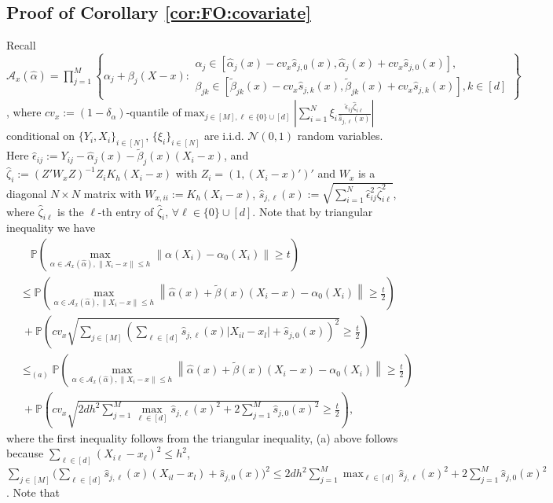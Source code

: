 \documentclass[11pt]{article}
\newcommand{\norm}[1]{\left\lVert #1 \right\rVert}
\begin{document}
\subsection{Proof of Corollary \ref{cor:FO:covariate}}
Recall  $\displaystyle\mathcal{A}_x(\hat\alpha) =\prod_{j=1}^M \left\{ \alpha_j+\beta_j(X-x) : \begin{array}{l}\alpha_j \in [\hat \alpha_j(x) - cv_x \hat s_{j,0}(x), \hat\alpha_j(x) + cv_x \hat s_{j,0}(x)], \\ 
\beta_{jk} \in [\tilde \beta_{jk}(x) - cv_x \hat s_{j,k}(x), \tilde \beta_{jk}(x) + cv_x \hat s_{j,k}(x)], k \in [d] 
\end{array}\right\}$,
where $cv_x := (1-\delta_\alpha)\mbox{-quantile of} \max_{ j \in  [M], \ell \in\{0\}\cup[d]}\left|\sum_{i=1}^N \xi_i \frac{\hat \epsilon_{ij} \hat{\zeta}_{i\ell}}{\hat s_{j,\ell}(x)}\right|$
$\mbox{conditional on }\{Y_i,X_i\}_{i\in[N]}$, $\{\xi_i\}_{i\in[N]}$ are i.i.d. $\mathcal{N}(0,1)$ random variables. Here $\hat\epsilon_{ij}:=Y_{ij} - \hat{\alpha}_j(x)-\tilde\beta_j(x)(X_i-x)$, and $\hat{\zeta}_{i} := (Z'W_xZ)^{-1}Z_i K_h(X_i-x)$  with $Z_i=(1, (X_i-x)')'$ and $W_{x}$ is a diagonal $N\times N$ matrix with $W_{x,ii}:=K_h(X_i-x)$, $\hat s_{j,\ell}(x) := \sqrt{\sum_{i=1}^N \hat \epsilon_{ij}^2 \hat{\zeta}_{i\ell}^2}$, where $\hat{\zeta}_{i\ell}$ is the $\ell$-th entry of $\hat{\zeta}_i$, $\forall \ell\in\{0\}\cup[d]$.  Note that by triangular inequality we have 
$$\begin{array}{rl}
&\quad\displaystyle\mathbb{P}\left(\max_{\alpha \in \mathcal{A}_x(\hat\alpha), \|X_i-x\|\leq h}\norm{\alpha(X_i)-\alpha_0(X_i)}\geq t\right)\\
&\displaystyle\leq\mathbb{P}\left(\max_{\alpha \in \mathcal{A}_x(\hat\alpha), \|X_i-x\|\leq h}\norm{\hat{\alpha}(x)+\tilde{\beta}(x)(X_i-x)-\alpha_0(X_i)}\geq\frac{t}{2}\right)\\
&\displaystyle\ +\mathbb{P}\left(cv_{x}\sqrt{\sum_{j\in[M]}\left(\sum_{\ell\in[d]}\hat{s}_{j,\ell}(x)|X_{il}-x_{l}|+\hat{s}_{j,0}(x)\right)^2}\geq\frac{t}{2}\right)\\
&\displaystyle\leq_{(a)}\mathbb{P}\left(\max_{\alpha \in \mathcal{A}_x(\hat\alpha), \|X_i-x\|\leq h}\norm{\hat{\alpha}(x)+\tilde{\beta}(x)(X_i-x)-\alpha_0(X_i)}\geq\frac{t}{2}\right)\\
&\displaystyle\ +\mathbb{P}\left(cv_{x}\sqrt{2dh^2\sum_{j=1}^M\max_{\ell\in[d]}\hat{s}_{j,\ell}(x)^2+2\sum_{j=1}^M\hat{s}_{j,0}(x)^2}\geq\frac{t}{2}\right),
\end{array}$$
where the first inequality follows from the triangular inequality, (a) above follows because $\sum_{\ell\in[d]}(X_{i\ell}-x_{\ell})^2\leq h^2$, $\sum_{j\in[M]}\bigg(\sum_{\ell\in[d]}\hat{s}_{j,\ell}(x)(X_{il}-x_{l})+\hat{s}_{j,0}(x)\bigg)^2\leq 2dh^2\sum_{j=1}^M\max_{\ell\in[d]}\hat{s}_{j,\ell}(x)^2+2\sum_{j=1}^M\hat{s}_{j,0}(x)^2$. Note that 
\end{document}
